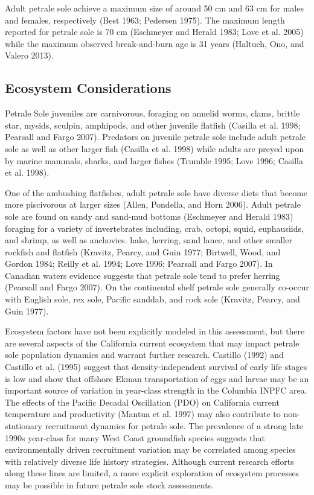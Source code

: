 \documentclass[11pt,
  english,
  letterpaper,
]{article}
\begin{document}
Adult petrale sole achieve a maximum size of around 50 cm and 63 cm for males and females, respectively (Best 1963; Pedersen 1975). The maximum length reported for petrale sole is 70 cm (Eschmeyer and Herald 1983; Love et al. 2005) while the maximum observed break-and-burn age is 31 years (Haltuch, Ono, and Valero 2013).

\hypertarget{ecosystem-considerations-1}{%
\subsection{Ecosystem Considerations}\label{ecosystem-considerations-1}}

Petrale Sole juveniles are carnivorous, foraging on annelid worms, clams, brittle star, mysids, sculpin, amphipods, and other juvenile flatfish (Casilla et al. 1998; Pearsall and Fargo 2007). Predators on juvenile petrale sole include adult petrale sole as well as other larger fish (Casilla et al. 1998) while adults are preyed upon by marine mammals, sharks, and larger fishes (Trumble 1995; Love 1996; Casilla et al. 1998).

One of the ambushing flatfishes, adult petrale sole have diverse diets that become more piscivorous at larger sizes (Allen, Pondella, and Horn 2006). Adult petrale sole are found on sandy and sand-mud bottoms (Eschmeyer and Herald 1983) foraging for a variety of invertebrates including, crab, octopi, squid, euphausiids, and shrimp, as well as anchovies. hake, herring, sand lance, and other smaller rockfish and flatfish (Kravitz, Pearcy, and Guin 1977; Birtwell, Wood, and Gordon 1984; Reilly et al. 1994; Love 1996; Pearsall and Fargo 2007). In Canadian waters evidence suggests that petrale sole tend to prefer herring (Pearsall and Fargo 2007). On the continental shelf petrale sole generally co-occur with English sole, rex sole, Pacific sanddab, and rock sole (Kravitz, Pearcy, and Guin 1977).

Ecosystem factors have not been explicitly modeled in this assessment, but there are several aspects of the California current ecosystem that may impact petrale sole population dynamics and warrant further research. Castillo (1992) and Castillo et al. (1995) suggest that density-independent survival of early life stages is low and show that offshore Ekman transportation of eggs and larvae may be an important source of variation in year-class strength in the Columbia INPFC area. The effects of the Pacific Decadal Oscillation (PDO) on California current temperature and productivity (Mantua et al. 1997) may also contribute to non-stationary recruitment dynamics for petrale sole. The prevalence of a strong late 1990s year-class for many West Coast groundfish species suggests that environmentally driven recruitment variation may be correlated among species with relatively diverse life history strategies. Although current research efforts along these lines are limited, a more explicit exploration of ecosystem processes may be possible in future petrale sole stock assessments.
\end{document}
